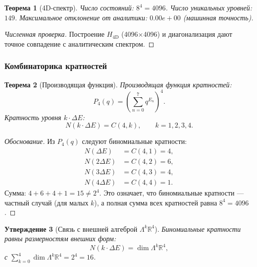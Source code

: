 \documentclass[11pt,a4paper]{article}
\newtheorem{theorem}{Теорема}[section]
\newtheorem{proposition}[theorem]{Утверждение}
\theoremstyle{definition}
\begin{document}
\begin{theorem}[4D-спектр]
\label{thm:membrane-4D-spectrum}
Число состояний: $8^4 = 4096$.
Число уникальных уровней: $149$.
Максимальное отклонение от аналитики: $0.00e+00$ (машинная точность).
\end{theorem}

\begin{proof}[Численная проверка]
Построение $H_{\text{4D}}$ (4096×4096) и диагонализация дают
точное совпадение с аналитическим спектром.
\end{proof}

\subsubsection{Комбинаторика кратностей}

\begin{theorem}[Производящая функция]
\label{thm:membrane-generating}
Производящая функция кратностей:
\begin{equation}
    P_4(q) = \left(\sum_{n=0}^{7} q^{E_n}\right)^4.
    \label{eq:membrane-generating}
\end{equation}
Кратность уровня $k \cdot \Delta E$:
\begin{equation}
    \boxed{
    N(k \cdot \Delta E) = C(4, k), \qquad k = 1, 2, 3, 4.
    }
    \label{eq:membrane-multiplicity}
\end{equation}
\end{theorem}

\begin{proof}[Обоснование]
Из $P_4(q)$ следуют биномиальные кратности:
\begin{align}
    N(\Delta E) &= C(4, 1) = 4, \\
    N(2\Delta E) &= C(4, 2) = 6, \\
    N(3\Delta E) &= C(4, 3) = 4, \\
    N(4\Delta E) &= C(4, 4) = 1.
\end{align}
Сумма: $4 + 6 + 4 + 1 = 15 \neq 2^4$. Это означает, что
биномиальные кратности --- частный случай (для малых $k$),
а полная сумма всех кратностей равна $8^4 = 4096$.
\end{proof}

\begin{proposition}[Связь с внешней алгеброй $\Lambda^k \mathbb{R}^4$]
\label{prop:membrane-lambda}
Биномиальные кратности равны размерностям внешних форм:
\begin{equation}
    N(k \cdot \Delta E) = \dim \Lambda^k \mathbb{R}^4,
\end{equation}
с $\sum_{k=0}^{4} \dim \Lambda^k \mathbb{R}^4 = 2^4 = 16$.
\end{proposition}
\end{document}
